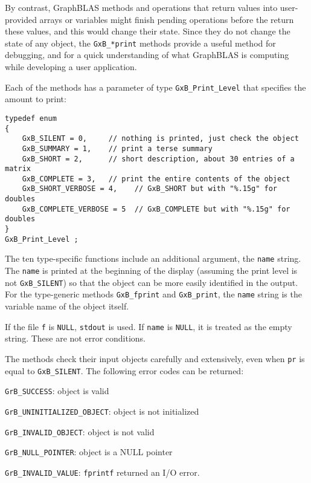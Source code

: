 \documentclass[12pt]{article}
\newenvironment{packed_itemize}{
\begin{itemize}
  \setlength{\itemsep}{1pt}
  \setlength{\parskip}{0pt}
  \setlength{\parsep}{0pt}
}{\end{itemize}}
\begin{document}
By contrast, GraphBLAS methods and operations that return values into
user-provided arrays or variables might finish pending operations before the
return these values, and this would change their state.  Since they do not
change the state of any object, the \verb'GxB_*print' methods provide a useful
method for debugging, and for a quick understanding of what GraphBLAS is
computing while developing a user application.

Each of the methods has a parameter of type \verb'GxB_Print_Level' that
specifies the amount to print:

{\footnotesize
\begin{verbatim}
typedef enum
{
    GxB_SILENT = 0,     // nothing is printed, just check the object
    GxB_SUMMARY = 1,    // print a terse summary
    GxB_SHORT = 2,      // short description, about 30 entries of a matrix
    GxB_COMPLETE = 3,   // print the entire contents of the object
    GxB_SHORT_VERBOSE = 4,    // GxB_SHORT but with "%.15g" for doubles
    GxB_COMPLETE_VERBOSE = 5  // GxB_COMPLETE but with "%.15g" for doubles
}
GxB_Print_Level ; \end{verbatim}}

The ten type-specific functions include an additional argument, the
\verb'name' string.  The \verb'name' is printed at the beginning of the display
(assuming the print level is not \verb'GxB_SILENT') so that the object can be
more easily identified in the output.  For the type-generic methods
\verb'GxB_fprint' and \verb'GxB_print', the \verb'name' string is the variable
name of the object itself.

If the file \verb'f' is \verb'NULL', \verb'stdout' is used.
If \verb'name' is \verb'NULL', it is treated
as the empty string.  These are not error conditions.

The methods check their input objects carefully and extensively, even when
\verb'pr' is equal to \verb'GxB_SILENT'.  The following error codes can be
returned:

\begin{packed_itemize}
\item \verb'GrB_SUCCESS':               object is valid
\item \verb'GrB_UNINITIALIZED_OBJECT':  object is not initialized
\item \verb'GrB_INVALID_OBJECT':        object is not valid
\item \verb'GrB_NULL_POINTER':          object is a NULL pointer
\item \verb'GrB_INVALID_VALUE':         \verb'fprintf' returned an I/O error.
\end{packed_itemize}
\end{document}
